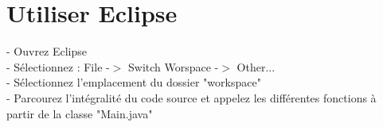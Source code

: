 \documentclass[12pt,a4paper,titlepage]{article}
\begin{document}
\section{Utiliser Eclipse}
- Ouvrez Eclipse\\
- Sélectionnez : File -$>$ Switch Worspace -$>$ Other...\\
- Sélectionnez l'emplacement du dossier "workspace"\\
- Parcourez l'intégralité du code source et appelez les différentes fonctions à partir de la classe "Main.java"
\end{document}
